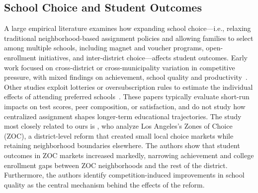 \documentclass[11pt]{article}
\begin{document}
\subsection{School Choice and Student Outcomes}
A large empirical literature examines how expanding school choice---i.e., relaxing traditional neighborhood-based assignment policies and allowing families to select among multiple schools, including magnet and voucher programs, open-enrollment initiatives, and inter-district choice---affects student outcomes. Early work focused on cross-district or cross-municipality variation in competitive pressure, with mixed findings on achievement, school quality and productivity~\citep{hoxby2000, hoxby2003, hsieh2006, rothstein2007}. Other studies exploit lotteries or oversubscription rules to estimate the individual effects of attending preferred schools~\citep{cullen2006, abdulkadiroglu2011, deming2014, muralidharan2015}. These papers typically evaluate short-run impacts on test scores, peer composition, or satisfaction, and do not study how centralized assignment shapes longer-term educational trajectories.
The study most closely related to ours is \citet{camposkearns2024}, who analyze Los Angeles’s Zones of Choice (ZOC), a district-level reform that created small local choice markets while retaining neighborhood boundaries elsewhere. The authors show that student outcomes in ZOC markets increased markedly, narrowing achievement and college enrollment gaps between ZOC neighborhoods and the rest of the district. Furthermore, the authors identify competition-induced improvements in school quality as the central mechanism behind the effects of the reform. 
\end{document}
